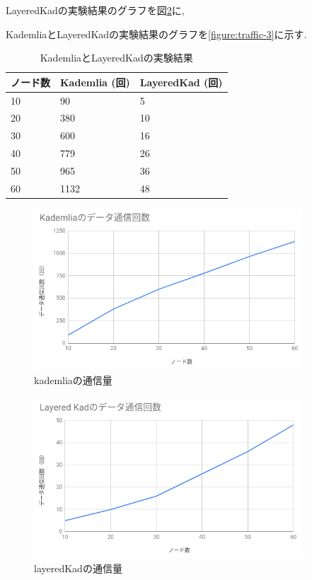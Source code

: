 \documentclass[sotsuron]{jcsie}
\begin{document}
LayeredKadの実験結果のグラフを図\ref{figure:traffic-2}に, 

KademliaとLayeredKadの実験結果のグラフを\ref{figure:traffic-3}に示す.

\begin{table}[H]
	\caption{KademliaとLayeredKadの実験結果}
	\centering
	\label{table:traffic-result}
	\begin{tabular}{|l|l|l|}
		\hline
		ノード数   &   
		Kademlia (回) &   
		LayeredKad (回)\\
		\hline
		10             &   
		90             &   
		5\\
		\hline
		20             &   
		380            &   
		10\\
		\hline
		30             &   
		600            &   
		16\\
		\hline
		40             &   
		779            &   
		26\\
		\hline
		50             &   
		965            &   
		36\\
		\hline
		60             &   
		1132           &   
		48\\
		\hline
	\end{tabular}
\end{table}

\begin{figure}[H]
	\centering
	\includegraphics[width=10cm]{./assets/image/kad_traffic.png}
	\caption{kademliaの通信量}
	\label{figure:traffic-1}
\end{figure}

\begin{figure}[H]
	\centering
	\includegraphics[width=10cm]{./assets/image/layered-kad_traffic.png}
	\caption{layeredKadの通信量}
	\label{figure:traffic-2}
\end{figure}
\end{document}
